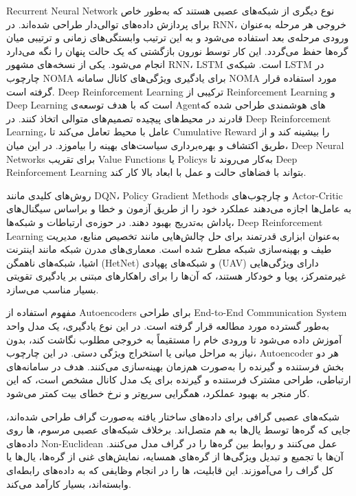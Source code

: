 \gls{Recurrent Neural Network}
نوع دیگری از شبکه‌های عصبی هستند که به‌طور خاص برای پردازش داده‌های توالی‌دار طراحی شده‌اند. در 
\gls{RNN}،
خروجی هر مرحله به‌عنوان ورودی مرحله‌ی بعد استفاده می‌شود و به این ترتیب وابستگی‌های زمانی و ترتیبی میان گره‌ها حفظ می‌گردد. این کار توسط نورون بازگشتی که یک حالت پنهان را نگه می‌دارد انجام می‌شود.
یکی از نسخه‌های مشهور 
\gls{RNN}،
\gls{LSTM}
است. شبکه‌ی 
\gls{LSTM}
در چارچوب 
\gls{NOMA}
برای یادگیری ویژگی‌های کانال سامانه 
\gls{NOMA}
مورد استفاده قرار گرفته است.
\gls{Deep Reinforcement Learning}
ترکیبی از 
\gls{Reinforcement Learning}
و 
\gls{Deep Learning}
است که با هدف توسعه‌ی 
\gls{Agent}های
هوشمندی طراحی شده که قادرند در محیط‌های پیچیده تصمیم‌های متوالی اتخاذ کنند. در 
\gls{Deep Reinforcement Learning}،
عامل با محیط تعامل می‌کند تا 
\gls{Cumulative Reward}
را بیشینه کند و از طریق اکتشاف و بهره‌برداری سیاست‌های بهینه را بیاموزد.
در این میان، 
\glspl{Deep Neural Network}
برای تقریب 
\glspl{Value Function}
یا 
\glspl{Policy}
به‌کار می‌روند تا 
\gls{Deep Reinforcement Learning}
بتواند با فضاهای حالت و عمل با ابعاد بالا کار کند.

روش‌های کلیدی مانند 
\gls{DQN}،
\glspl{Policy Gradient Method}
و چارچوب‌های Actor-Critic به عامل‌ها اجازه می‌دهند عملکرد خود را از طریق آزمون و خطا و براساس سیگنال‌های پاداش به‌تدریج بهبود دهند.
در حوزه‌ی ارتباطات و شبکه‌ها، 
\gls{Deep Reinforcement Learning}
 به‌عنوان ابزاری قدرتمند برای حل چالش‌هایی مانند تخصیص منابع، مدیریت طیف و بهینه‌سازی شبکه مطرح شده است.
معماری‌های مدرن شبکه مانند اینترنت اشیا، شبکه‌های ناهمگن 
(\gls{HetNet})
 و شبکه‌های پهپادی 
(\gls{UAV})
  دارای ویژگی‌هایی غیرمتمرکز، پویا و خودکار هستند، که آن‌ها را برای راهکارهای مبتنی بر یادگیری تقویتی بسیار مناسب می‌سازد.

مفهوم استفاده از 
\glspl{Autoencoder}
 برای طراحی 
\gls{End-to-End Communication System}
به‌طور گسترده مورد مطالعه قرار گرفته است. در این نوع یادگیری، یک مدل واحد آموزش داده می‌شود تا ورودی خام را مستقیماً به خروجی مطلوب نگاشت کند، بدون نیاز به مراحل میانی یا استخراج ویژگی دستی.
در این چارچوب، 
\gls{Autoencoder}
 هر دو بخش فرستنده و گیرنده را به‌صورت هم‌زمان بهینه‌سازی می‌کنند. هدف در سامانه‌های ارتباطی، طراحی مشترک فرستنده و گیرنده برای یک مدل کانال مشخص است، که این کار منجر به بهبود عملکرد، همگرایی سریع‌تر و نرخ خطای بیت کمتر می‌شود.

شبکه‌های عصبی گرافی برای داده‌های ساختار یافته به‌صورت گراف طراحی شده‌اند، جایی که گره‌ها توسط یال‌ها به هم متصل‌اند. برخلاف شبکه‌های عصبی مرسوم، 
ها
روی داده‌های 
\gls{Non-Euclidean}
عمل می‌کنند و روابط بین گره‌ها را در گراف مدل می‌کنند.
آن‌ها با تجمیع و تبدیل ویژگی‌ها از گره‌های همسایه، نمایش‌های غنی از گره‌ها، یال‌ها یا کل گراف را می‌آموزند. این قابلیت، 
ها
را در انجام وظایفی که به داده‌های رابطه‌ای وابسته‌اند، بسیار کارآمد می‌کند.

